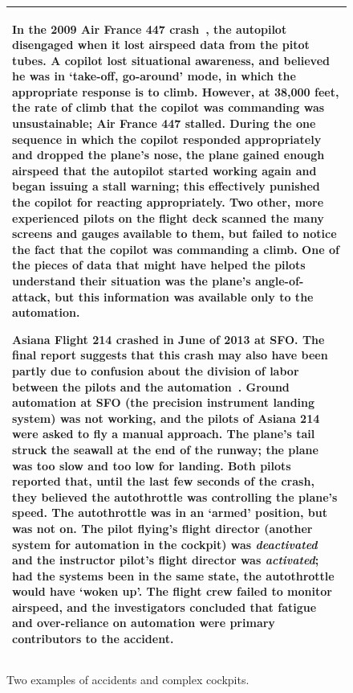 \documentclass[journal]{IEEEtran}
\begin{document}
\begin{figure}[!t]
\small
\begin{tabular}{|p{.95\linewidth}|}\hline
In the 2009 Air France 447 crash~\cite{AirFranceFinal2012}, the autopilot disengaged when it lost airspeed data from the pitot tubes.  
A copilot lost situational awareness, and believed he was in `take-off, go-around' mode, in which the appropriate response is to climb.  
However, at 38,000 feet, the rate of climb that the copilot was commanding was unsustainable; Air France 447 stalled.
During the one sequence in which the copilot responded appropriately and dropped the plane's nose, the plane gained enough airspeed that the autopilot started working again and began issuing a stall warning; this effectively punished the copilot for reacting appropriately.  
Two other, more experienced pilots on the flight deck scanned the many screens and gauges available to them, but failed to notice the fact that the copilot was commanding a climb.  
One of the pieces of data that might have helped the pilots understand their situation was the plane's angle-of-attack, but this information was available only to the automation. 

Asiana Flight 214 crashed in June of 2013 at SFO.  
The final report suggests that this crash may also have been partly due to confusion about the division of labor between the pilots and the automation~\cite{AsianaFinal2014}.  
Ground automation at SFO (the precision instrument landing system) was not working, and the pilots of Asiana 214 were asked to fly a manual approach.  
The plane's tail struck the seawall at the end of the runway; the plane was too slow and too low for landing.  
Both pilots reported that, until the last few seconds of the crash, they believed the autothrottle was controlling the plane's speed.  
The autothrottle was in an `armed' position, but was not on.  The pilot flying's flight director (another system for automation in the cockpit) was \emph{deactivated} and the instructor pilot's flight director was \emph{activated}; had the systems been in the same state, the autothrottle would have `woken up'. 
The flight crew failed to monitor airspeed, and the investigators concluded that fatigue and over-reliance on automation were primary contributors to the accident.\\\hline
\end{tabular}
\caption{Two examples of accidents and complex cockpits.}\label{fig:accident}
\end{figure}
\end{document}
